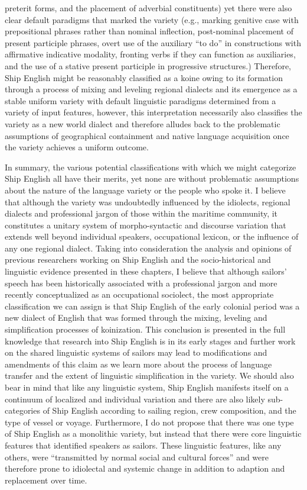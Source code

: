 preterit forms, and the placement of adverbial constituents) yet there were also clear default paradigms that marked the variety (e.g., marking genitive case with prepositional phrases rather than nominal inflection, post-nominal placement of present participle phrases, overt use of the auxiliary “to do” in constructions with affirmative indicative modality, fronting verbs if they can function as auxiliaries, and the use of a stative present participle in progressive structures.) Therefore, Ship English might be reasonably classified as a koine owing to its formation through a process of mixing and leveling regional dialects and its emergence as a stable uniform variety with default linguistic paradigms determined from a variety of input features, however, this interpretation necessarily also classifies the variety as a new world dialect and therefore alludes back to the problematic assumptions of geographical containment and native language acquisition once the variety achieves a uniform outcome. 

  In summary, the various potential classifications with which we might categorize Ship English all have their merits, yet none are without problematic assumptions about the nature of the language variety or the people who spoke it. I believe that although the variety was undoubtedly influenced by the idiolects, regional dialects and professional jargon of those within the maritime community, it constitutes a unitary system of morpho-syntactic and discourse variation that extends well beyond individual speakers, occupational lexicon, or the influence of any one regional dialect. Taking into consideration the analysis and opinions of previous researchers working on Ship English and the socio-historical and linguistic evidence presented in these chapters, I believe that although sailors’ speech has been historically associated with a professional jargon and more recently conceptualized as an occupational sociolect, the most appropriate classification we can assign is that Ship English of the early colonial period was a new dialect of English that was formed through the mixing, leveling and simplification processes of koinization. This conclusion is presented in the full knowledge that research into Ship English is in its early stages and further work on the shared linguistic systems of sailors may lead to modifications and amendments of this claim as we learn more about the process of language transfer and the extent of linguistic simplification in the variety. We should also bear in mind that like any linguistic system, Ship English manifests itself on a continuum of localized and individual variation and there are also likely sub-categories of Ship English according to sailing region, crew composition, and the type of vessel or voyage. Furthermore, I do not propose that there was one type of Ship English as a monolithic variety, but instead that there were core linguistic features that identified speakers as sailors. These linguistic features, like any others, were “transmitted by normal social and cultural forces” \citep[129]{McDavid1979} and were therefore prone to idiolectal and systemic change in addition to adaption and replacement over time.

